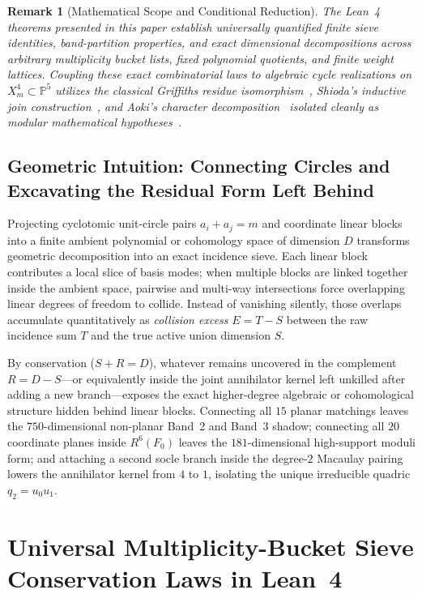 \documentclass[11pt,a4paper]{article}
\newtheorem{remark}[theorem]{Remark}
\begin{document}
\begin{remark}[Mathematical Scope and Conditional Reduction]
  The Lean~4 theorems presented in this paper establish universally quantified finite sieve identities, band-partition properties, and exact dimensional decompositions across arbitrary multiplicity bucket lists, fixed polynomial quotients, and finite weight lattices. Coupling these exact combinatorial laws to algebraic cycle realizations on $X_m^4 \subset \mathbb{P}^5$ utilizes the classical Griffiths residue isomorphism~\cite{Griffiths1969}, Shioda's inductive join construction~\cite{Shioda1979}, and Aoki's character decomposition~\cite{Aoki1983} isolated cleanly as modular mathematical hypotheses~\cite{Deligne2000}.
\end{remark}

\subsection{Geometric Intuition: Connecting Circles and Excavating the Residual Form Left Behind}

Projecting cyclotomic unit-circle pairs $a_i + a_j = m$ and coordinate linear blocks into a finite ambient polynomial or cohomology space of dimension $D$ transforms geometric decomposition into an exact incidence sieve. Each linear block contributes a local slice of basis modes; when multiple blocks are linked together inside the ambient space, pairwise and multi-way intersections force overlapping linear degrees of freedom to collide. Instead of vanishing silently, those overlaps accumulate quantitatively as \emph{collision excess} $E = T - S$ between the raw incidence sum $T$ and the true active union dimension $S$.

By conservation ($S + R = D$), whatever remains uncovered in the complement $R = D - S$---or equivalently inside the joint annihilator kernel left unkilled after adding a new branch---exposes the exact higher-degree algebraic or cohomological structure hidden behind linear blocks. Connecting all $15$ planar matchings leaves the $750$-dimensional non-planar Band~2 and Band~3 shadow; connecting all $20$ coordinate planes inside $R^6(F_0)$ leaves the $181$-dimensional high-support moduli form; and attaching a second socle branch inside the degree-$2$ Macaulay pairing lowers the annihilator kernel from $4$ to $1$, isolating the unique irreducible quadric $q_2 = u_0 u_1$.

\section{Universal Multiplicity-Bucket Sieve Conservation Laws in Lean~4}
\end{document}
